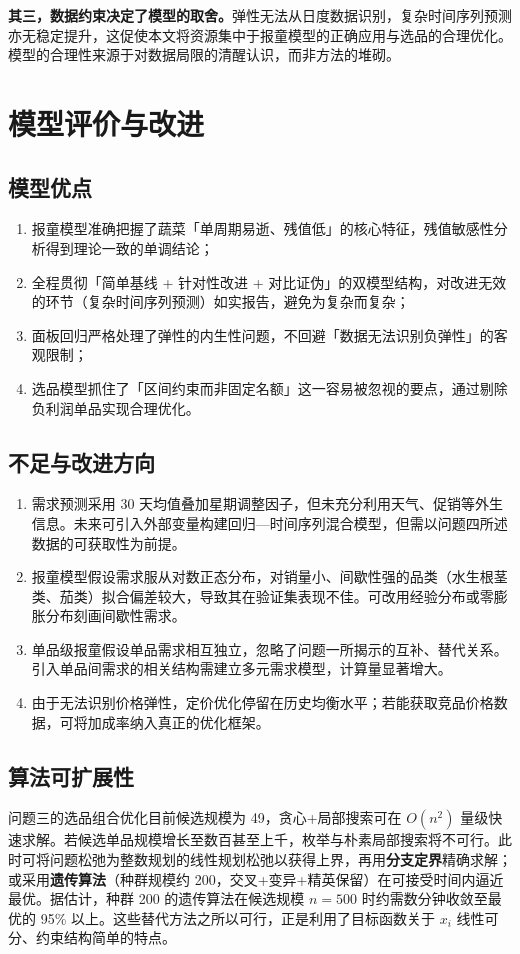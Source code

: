 \documentclass[12pt]{ctexart}
\begin{document}
\textbf{其三，数据约束决定了模型的取舍。}弹性无法从日度数据识别，复杂时间序列预测亦无稳定提升，这促使本文将资源集中于报童模型的正确应用与选品的合理优化。模型的合理性来源于对数据局限的清醒认识，而非方法的堆砌。

\section{模型评价与改进}

\subsection{模型优点}
\begin{enumerate}
\item 报童模型准确把握了蔬菜「单周期易逝、残值低」的核心特征，残值敏感性分析得到理论一致的单调结论；
\item 全程贯彻「简单基线 + 针对性改进 + 对比证伪」的双模型结构，对改进无效的环节（复杂时间序列预测）如实报告，避免为复杂而复杂；
\item 面板回归严格处理了弹性的内生性问题，不回避「数据无法识别负弹性」的客观限制；
\item 选品模型抓住了「区间约束而非固定名额」这一容易被忽视的要点，通过剔除负利润单品实现合理优化。
\end{enumerate}

\subsection{不足与改进方向}
\begin{enumerate}
\item 需求预测采用 30 天均值叠加星期调整因子，但未充分利用天气、促销等外生信息。未来可引入外部变量构建回归—时间序列混合模型，但需以问题四所述数据的可获取性为前提。
\item 报童模型假设需求服从对数正态分布，对销量小、间歇性强的品类（水生根茎类、茄类）拟合偏差较大，导致其在验证集表现不佳。可改用经验分布或零膨胀分布刻画间歇性需求。
\item 单品级报童假设单品需求相互独立，忽略了问题一所揭示的互补、替代关系。引入单品间需求的相关结构需建立多元需求模型，计算量显著增大。
\item 由于无法识别价格弹性，定价优化停留在历史均衡水平；若能获取竞品价格数据，可将加成率纳入真正的优化框架。
\end{enumerate}

\subsection{算法可扩展性}
问题三的选品组合优化目前候选规模为 49，贪心+局部搜索可在 $O(n^2)$ 量级快速求解。若候选单品规模增长至数百甚至上千，枚举与朴素局部搜索将不可行。此时可将问题松弛为整数规划的线性规划松弛以获得上界，再用\textbf{分支定界}精确求解；或采用\textbf{遗传算法}（种群规模约 200，交叉+变异+精英保留）在可接受时间内逼近最优。据估计，种群 200 的遗传算法在候选规模 $n=500$ 时约需数分钟收敛至最优的 95\% 以上。这些替代方法之所以可行，正是利用了目标函数关于 $x_i$ 线性可分、约束结构简单的特点。
\end{document}
